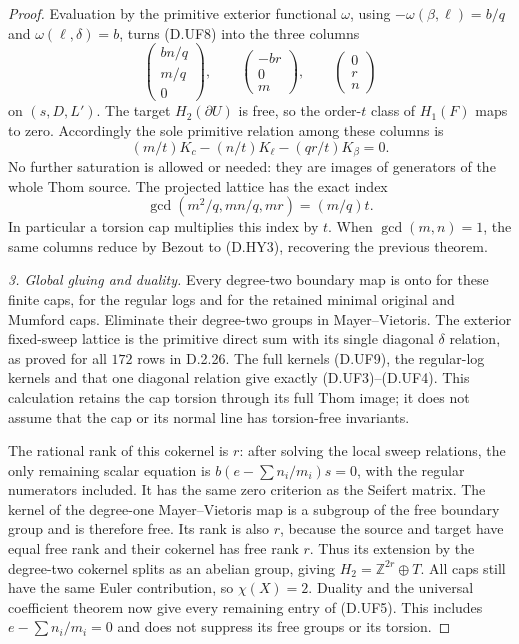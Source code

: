 \begin{proof}
Evaluation by the primitive exterior functional $\omega$,
using $-\omega(\beta,\ell)=b/q$ and
$\omega(\ell,\delta)=b$, turns (D.UF8) into the three columns
\[
 \begin{pmatrix}bn/q\\m/q\\0\end{pmatrix},\qquad
 \begin{pmatrix}-br\\0\\m\end{pmatrix},\qquad
 \begin{pmatrix}0\\r\\n\end{pmatrix}                       \tag{D.UF9}
\]
on $(s,D,L')$. The target $H_2(\partial U)$ is free, so the
order-$t$ class of $H_1(F)$ maps to zero. Accordingly the sole
primitive relation among these columns is
\[
 (m/t)K_c-(n/t)K_\ell-(qr/t)K_\beta=0.
\]
No further saturation is allowed or needed: they are images
of generators of the whole Thom source. The projected
lattice has the exact index
\[
 \gcd\left(m^2/q,mn/q,mr\right)=(m/q)t.                    \tag{D.UF10}
\]
In particular a torsion cap multiplies this index by $t$.
When $\gcd(m,n)=1$, the same columns reduce by Bezout to
(D.HY3), recovering the previous theorem.

\emph{3. Global gluing and duality.}
Every degree-two boundary map is onto for these finite caps,
for the regular logs and for the retained minimal original and
Mumford caps. Eliminate their degree-two groups in
Mayer--Vietoris. The exterior fixed-sweep lattice is the
primitive direct sum with its single diagonal $\delta$
relation, as proved for all $172$ rows in D.2.26.
The full kernels (D.UF9), the regular-log kernels and that
one diagonal relation give exactly (D.UF3)--(D.UF4).
This calculation retains the cap torsion through its full
Thom image; it does not assume that the cap or its normal
line has torsion-free invariants.

The rational rank of this cokernel is $r$: after solving the
local sweep relations, the only remaining scalar equation is
$b(e-\sum n_i/m_i)s=0$, with the regular numerators included.
It has the same zero criterion as the Seifert matrix. The
kernel of the degree-one Mayer--Vietoris map is a subgroup
of the free boundary group and is therefore free. Its rank
is also $r$, because the source and target have equal free
rank and their cokernel has free rank $r$. Thus its extension
by the degree-two cokernel splits as an abelian group, giving
$H_2=\mathbb Z^{2r}\oplus T$. All caps still have the same
Euler contribution, so $\chi(X)=2$. Duality and the universal
coefficient theorem now give every remaining entry of (D.UF5).
This includes $e-\sum n_i/m_i=0$ and does not suppress its
free groups or its torsion.
\end{proof}


